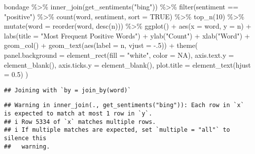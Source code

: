 \documentclass[
]{article}
\newenvironment{Shaded}{\begin{snugshade}}{\end{snugshade}}
\newcommand{\AttributeTok}[1]{\textcolor[rgb]{0.77,0.63,0.00}{#1}}
\newcommand{\ConstantTok}[1]{\textcolor[rgb]{0.00,0.00,0.00}{#1}}
\newcommand{\DecValTok}[1]{\textcolor[rgb]{0.00,0.00,0.81}{#1}}
\newcommand{\FloatTok}[1]{\textcolor[rgb]{0.00,0.00,0.81}{#1}}
\newcommand{\FunctionTok}[1]{\textcolor[rgb]{0.00,0.00,0.00}{#1}}
\newcommand{\NormalTok}[1]{#1}
\newcommand{\SpecialCharTok}[1]{\textcolor[rgb]{0.00,0.00,0.00}{#1}}
\newcommand{\StringTok}[1]{\textcolor[rgb]{0.31,0.60,0.02}{#1}}
\begin{document}
\begin{Shaded}
\begin{Highlighting}[]
\NormalTok{bondage }\SpecialCharTok{\%\textgreater{}\%} 
  \FunctionTok{inner\_join}\NormalTok{(}\FunctionTok{get\_sentiments}\NormalTok{(}\StringTok{"bing"}\NormalTok{)) }\SpecialCharTok{\%\textgreater{}\%} 
  \FunctionTok{filter}\NormalTok{(sentiment }\SpecialCharTok{==} \StringTok{"positive"}\NormalTok{) }\SpecialCharTok{\%\textgreater{}\%}
  \FunctionTok{count}\NormalTok{(word, sentiment, }\AttributeTok{sort =} \ConstantTok{TRUE}\NormalTok{) }\SpecialCharTok{\%\textgreater{}\%} 
  \FunctionTok{top\_n}\NormalTok{(}\DecValTok{10}\NormalTok{) }\SpecialCharTok{\%\textgreater{}\%}
  \FunctionTok{mutate}\NormalTok{(}\AttributeTok{word =} \FunctionTok{reorder}\NormalTok{(word, }\FunctionTok{desc}\NormalTok{(n))) }\SpecialCharTok{\%\textgreater{}\%}
  \FunctionTok{ggplot}\NormalTok{() }\SpecialCharTok{+} 
  \FunctionTok{aes}\NormalTok{(}\AttributeTok{x =}\NormalTok{ word, }\AttributeTok{y =}\NormalTok{ n) }\SpecialCharTok{+}
  \FunctionTok{labs}\NormalTok{(}\AttributeTok{title =} \StringTok{"Most Frequent Positive Words"}\NormalTok{) }\SpecialCharTok{+} 
  \FunctionTok{ylab}\NormalTok{(}\StringTok{"Count"}\NormalTok{) }\SpecialCharTok{+} 
  \FunctionTok{xlab}\NormalTok{(}\StringTok{"Word"}\NormalTok{) }\SpecialCharTok{+}
  \FunctionTok{geom\_col}\NormalTok{() }\SpecialCharTok{+} 
  \FunctionTok{geom\_text}\NormalTok{(}\FunctionTok{aes}\NormalTok{(}\AttributeTok{label =}\NormalTok{ n, }\AttributeTok{vjust =} \SpecialCharTok{{-}}\NormalTok{.}\DecValTok{5}\NormalTok{)) }\SpecialCharTok{+} 
  \FunctionTok{theme}\NormalTok{(}
    \AttributeTok{panel.background =} \FunctionTok{element\_rect}\NormalTok{(}\AttributeTok{fill =} \StringTok{"white"}\NormalTok{, }\AttributeTok{color =} \ConstantTok{NA}\NormalTok{),}
    \AttributeTok{axis.text.y =} \FunctionTok{element\_blank}\NormalTok{(), }
    \AttributeTok{axis.ticks.y =} \FunctionTok{element\_blank}\NormalTok{(),}
    \AttributeTok{plot.title =} \FunctionTok{element\_text}\NormalTok{(}\AttributeTok{hjust =} \FloatTok{0.5}\NormalTok{)}
\NormalTok{  )}
\end{Highlighting}
\end{Shaded}

\begin{verbatim}
## Joining with `by = join_by(word)`
\end{verbatim}

\begin{verbatim}
## Warning in inner_join(., get_sentiments("bing")): Each row in `x` is expected to match at most 1 row in `y`.
## i Row 5334 of `x` matches multiple rows.
## i If multiple matches are expected, set `multiple = "all"` to silence this
##   warning.
\end{verbatim}
\end{document}
